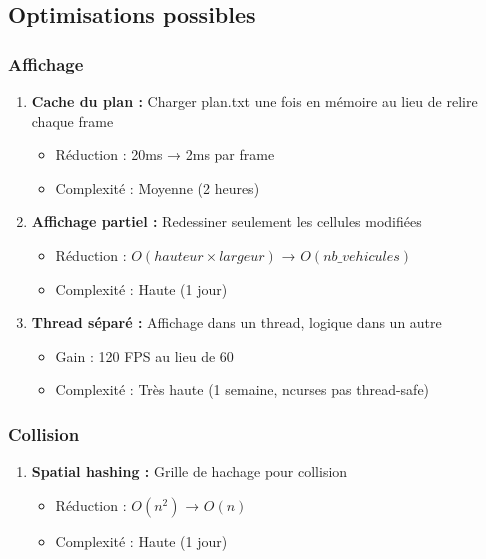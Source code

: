\documentclass[12pt,a4paper]{article}
\begin{document}
\subsection{Optimisations possibles}

\subsubsection{Affichage}

\begin{enumerate}
    \item \textbf{Cache du plan :} Charger plan.txt une fois en mémoire au lieu de relire chaque frame
    \begin{itemize}
        \item Réduction : 20ms → 2ms par frame
        \item Complexité : Moyenne (2 heures)
    \end{itemize}

    \item \textbf{Affichage partiel :} Redessiner seulement les cellules modifiées
    \begin{itemize}
        \item Réduction : $O(hauteur \times largeur)$ → $O(nb\_vehicules)$
        \item Complexité : Haute (1 jour)
    \end{itemize}

    \item \textbf{Thread séparé :} Affichage dans un thread, logique dans un autre
    \begin{itemize}
        \item Gain : 120 FPS au lieu de 60
        \item Complexité : Très haute (1 semaine, ncurses pas thread-safe)
    \end{itemize}
\end{enumerate}

\subsubsection{Collision}

\begin{enumerate}
    \item \textbf{Spatial hashing :} Grille de hachage pour collision
    \begin{itemize}
        \item Réduction : $O(n^2)$ → $O(n)$
        \item Complexité : Haute (1 jour)
    \end{itemize}
\end{enumerate}
\end{document}
